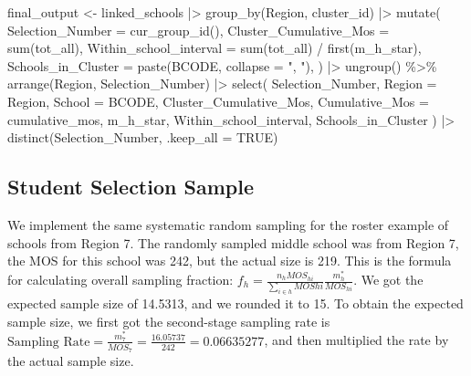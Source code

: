 \documentclass[
  12pt]{article}
\newenvironment{Shaded}{\begin{snugshade}}{\end{snugshade}}
\newcommand{\AttributeTok}[1]{\textcolor[rgb]{0.40,0.45,0.13}{#1}}
\newcommand{\ConstantTok}[1]{\textcolor[rgb]{0.56,0.35,0.01}{#1}}
\newcommand{\FunctionTok}[1]{\textcolor[rgb]{0.28,0.35,0.67}{#1}}
\newcommand{\NormalTok}[1]{\textcolor[rgb]{0.00,0.23,0.31}{#1}}
\newcommand{\OtherTok}[1]{\textcolor[rgb]{0.00,0.23,0.31}{#1}}
\newcommand{\SpecialCharTok}[1]{\textcolor[rgb]{0.37,0.37,0.37}{#1}}
\newcommand{\StringTok}[1]{\textcolor[rgb]{0.13,0.47,0.30}{#1}}
\begin{document}
\begin{Shaded}
\begin{Highlighting}[]
\NormalTok{final\_output }\OtherTok{\textless{}{-}}\NormalTok{ linked\_schools }\SpecialCharTok{|\textgreater{}} 
  \FunctionTok{group\_by}\NormalTok{(Region, cluster\_id) }\SpecialCharTok{|\textgreater{}}
  \FunctionTok{mutate}\NormalTok{(}
    \AttributeTok{Selection\_Number =} \FunctionTok{cur\_group\_id}\NormalTok{(),}
    \AttributeTok{Cluster\_Cumulative\_Mos =} \FunctionTok{sum}\NormalTok{(tot\_all),}
    \AttributeTok{Within\_school\_interval =} \FunctionTok{sum}\NormalTok{(tot\_all) }\SpecialCharTok{/} \FunctionTok{first}\NormalTok{(m\_h\_star),}
    \AttributeTok{Schools\_in\_Cluster =} \FunctionTok{paste}\NormalTok{(BCODE, }\AttributeTok{collapse =} \StringTok{", "}\NormalTok{),}
\NormalTok{  ) }\SpecialCharTok{|\textgreater{}}
  \FunctionTok{ungroup}\NormalTok{() }\SpecialCharTok{\%\textgreater{}\%}
  \FunctionTok{arrange}\NormalTok{(Region, Selection\_Number) }\SpecialCharTok{|\textgreater{}}
  \FunctionTok{select}\NormalTok{(}
\NormalTok{    Selection\_Number,}
    \AttributeTok{Region =}\NormalTok{ Region, }
    \AttributeTok{School =}\NormalTok{ BCODE,}
\NormalTok{    Cluster\_Cumulative\_Mos,}
    \AttributeTok{Cumulative\_Mos =}\NormalTok{ cumulative\_mos,}
\NormalTok{    m\_h\_star,}
\NormalTok{    Within\_school\_interval,}
\NormalTok{    Schools\_in\_Cluster}
\NormalTok{  ) }\SpecialCharTok{|\textgreater{}}
  \FunctionTok{distinct}\NormalTok{(Selection\_Number, }\AttributeTok{.keep\_all =} \ConstantTok{TRUE}\NormalTok{)}
\end{Highlighting}
\end{Shaded}

\subsection{Student Selection Sample}\label{student-selection-sample}

We implement the same systematic random sampling for the roster example
of schools from Region 7. The randomly sampled middle school was from
Region 7, the MOS for this school was 242, but the actual size is 219.
This is the formula for calculating overall sampling fraction:
\(f_h = \frac{n_h MOS_{hi} }{\sum_{i \in h} MOS{hi} } \frac{m^*_h}{MOS_{hi}}\).
We got the expected sample size of 14.5313, and we rounded it to 15. To
obtain the expected sample size, we first got the second-stage sampling
rate is
\(\text{Sampling Rate} = \frac{m^*_{7}}{MOS_7} = \frac{16.05737}{242} = 0.06635277\),
and then multiplied the rate by the actual sample size.
\end{document}
